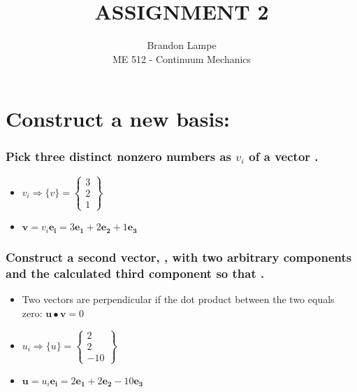\documentclass[10pt, letterpaper]{article}
\begin{document}
 
 
\title{ASSIGNMENT 2}%
\author{Brandon Lampe\\ %
ME 512 - Continuum Mechanics} %
 
\maketitle
 
\section{Construct a new basis:}  %
	\subsubsection{Pick three distinct nonzero numbers as $v_i$ of a vector .}
		\begin{itemize}
			\item $v_i \Rightarrow \{v\} = \begin{Bmatrix} 3 \\ 2 \\ 1 \end{Bmatrix}$
			\item $\boldsymbol{v} = v_i \boldsymbol{e_i} = 3 \boldsymbol{e_1} + 2 \boldsymbol{e_2} +1\boldsymbol{e_3}$
		\end{itemize}
				
	\subsubsection{Construct a second vector, , with two arbitrary components and the calculated third component so that . }
		\begin{itemize}
			\item Two vectors are perpendicular if the dot product between the two equals zero:  
				$\boldsymbol{u} \bullet \boldsymbol{v} = 0$
			\item $u_i \Rightarrow \{u\} = \begin{Bmatrix} 2 \\ 2 \\ -10 \end{Bmatrix}$
			\item $\boldsymbol{u} = u_i \boldsymbol{e_i} = 2 \boldsymbol{e_1} + 2 \boldsymbol{e_2} -10\boldsymbol{e_3}$
		\end{itemize}
\end{document}
